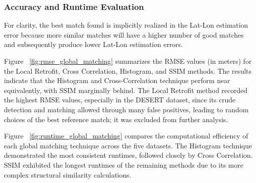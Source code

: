 \subsubsection*{Accuracy and Runtime Evaluation}

For clarity, the best match found is implicitly realized in the Lat-Lon estimation error because more similar matches will have a higher number of good matches and subsequently produce lower Lat-Lon estimation errors. 

Figure ~\ref{fig:rmse_global_matching} summarizes the RMSE values (in meters) for the Local Retrofit, Cross Correlation, Histogram, and SSIM methods. The results indicate that the Histogram and Cross-Correlation technique perform near equivalently, with SSIM marginally behind. The Local Retrofit method recorded the highest RMSE values, especially in the DESERT dataset, since its crude detection and matching allowed through many false positives, leading to random choices of the best reference match; it was excluded from further analysis.

Figure ~\ref{fig:runtime_global_matching} compares the computational efficiency of each global matching technique across the five datasets. The Histogram technique demonstrated the most consistent runtimes, followed closely by Cross Correlation. SSIM exhibited the longest runtimes of the remaining methods due to its more complex structural similarity calculations. 


